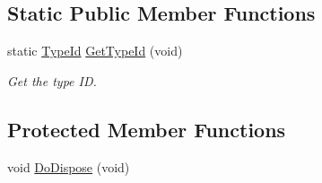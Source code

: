 \subsection*{Static Public Member Functions}
\begin{DoxyCompactItemize}
\item 
static \hyperlink{classns3_1_1TypeId}{Type\+Id} \hyperlink{classns3_1_1Ipv4GlobalRouting_ae32c45a7d6f10a4501d4d59c51f872ae}{Get\+Type\+Id} (void)
\begin{DoxyCompactList}\small\item\em Get the type ID. \end{DoxyCompactList}\end{DoxyCompactItemize}
\subsection*{Protected Member Functions}
\begin{DoxyCompactItemize}
\item 
void \hyperlink{classns3_1_1Ipv4GlobalRouting_a3ed00382c689954195ea0ac02531d1ea}{Do\+Dispose} (void)
\end{DoxyCompactItemize}
